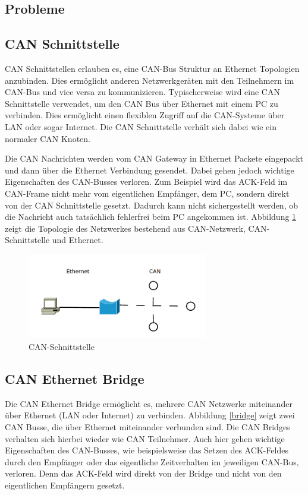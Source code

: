 \subsection{Probleme}
	
\subsection{CAN Schnittstelle}

CAN Schnittstellen erlauben es, eine CAN-Bus Struktur an Ethernet Topologien anzubinden. Dies ermöglicht anderen Netzwerkgeräten mit den Teilnehmern im CAN-Bus und vice versa zu kommunizieren. Typischerweise wird eine CAN Schnittstelle verwendet, um den CAN Bus über Ethernet mit einem PC zu verbinden. Dies ermöglicht einen flexiblen Zugriff auf die CAN-Systeme über LAN oder sogar Internet. Die CAN Schnittstelle verhält sich dabei wie ein normaler CAN Knoten. \citep{STE}

Die CAN Nachrichten werden vom CAN Gateway in Ethernet Packete eingepackt und dann über die Ethernet Verbindung gesendet. Dabei gehen jedoch wichtige Eigenschaften des CAN-Busses verloren. Zum Beispiel wird das ACK-Feld im CAN-Frame nicht mehr vom eigentlichen Empfänger, dem PC, sondern direkt von der CAN Schnittstelle gesetzt. Dadurch kann nicht sichergestellt werden, ob die Nachricht auch tatsächlich fehlerfrei beim PC angekommen ist.
Abbildung \ref{gateway} zeigt die Topologie des Netzwerkes bestehend aus CAN-Netzwerk, CAN-Schnittstelle und Ethernet.

\begin{figure}[h] 
\centering
\includegraphics[width=0.7\textwidth]{figures/can_gateway}
\caption{CAN-Schnittstelle} 
\label{gateway}
\end{figure} 

\subsection{CAN Ethernet Bridge}

Die CAN Ethernet Bridge ermöglicht es, mehrere CAN Netzwerke miteinander über Ethernet (LAN oder Internet) zu verbinden. Abbildung \ref{bridge} zeigt zwei CAN Busse, die über Ethernet miteinander verbunden sind. Die CAN Bridges verhalten sich hierbei wieder wie CAN Teilnehmer. Auch hier gehen wichtige Eigenschaften des CAN-Busses, wie beispielsweise das Setzen des ACK-Feldes durch den Empfänger oder das eigentliche Zeitverhalten im jeweiligen CAN-Bus, verloren. Denn das ACK-Feld wird direkt von der Bridge und nicht von den eigentlichen Empfängern gesetzt.

